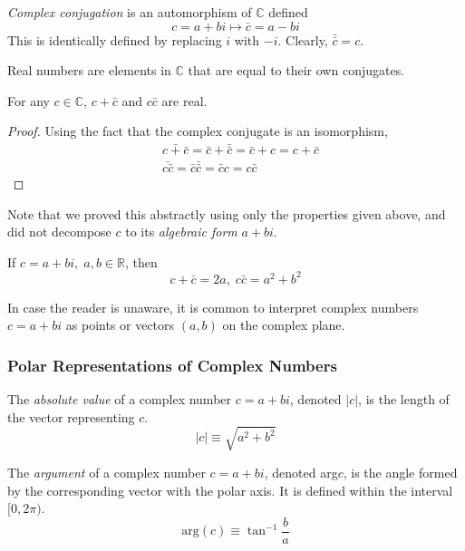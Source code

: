 \documentclass{article}
\begin{document}
    \begin{definition}
      \textit{Complex conjugation} is an automorphism of $\mathbb{C}$ defined
      \[ c = a + b i \mapsto \bar{c} = a - b i\]
      This is identically defined by replacing $i$ with $-i$. Clearly, $\bar{\bar{c}} = c$. 
    \end{definition}

    \begin{definition}
      Real numbers are elements in $\mathbb{C}$ that are equal to their own conjugates. 
    \end{definition}

    \begin{proposition}
      For any $c \in \mathbb{C}$, $c + \bar{c}$ and $c \bar{c}$ are real. 
    \end{proposition}
    \begin{proof}
      Using the fact that the complex conjugate is an isomorphism, 
      \begin{align*}
        & \bar{c + \bar{c}} = \bar{c} + \bar{\bar{c}} = \bar{c} + c = c + \bar{c} \\
        & \bar{ c \bar{c}} = \bar{c} \bar{\bar{c}} = \bar{c} c = c \bar{c}
      \end{align*}
    \end{proof}
    Note that we proved this abstractly using only the properties given above, and did not decompose $c$ to its \textit{algebraic form} $a + b i$. 

    If $c = a + b i, \; a, b \in \mathbb{R}$, then 
    \[ c + \bar{c} = 2a, \; c \bar{c} = a^2 + b^2\]

    In case the reader is unaware, it is common to interpret complex numbers $c = a + b i$ as points or vectors $(a, b)$ on the complex plane. 

    \subsubsection{Polar Representations of Complex Numbers}

      \begin{definition}
        The \textit{absolute value} of a complex number $c = a + b i$, denoted $|c|$, is the length of the vector representing $c$. 
        \[ |c| \equiv \sqrt{a^2 + b^2}\]
      \end{definition}

      \begin{definition}
        The \textit{argument} of a complex number $c = a + b i$, denoted arg$c$, is the angle formed by the corresponding vector with the polar axis. It is defined within the interval $[0, 2\pi)$. 
        \[ \text{arg}(c) \equiv \tan^{-1}{\frac{b}{a}}\]
      \end{definition}
\end{document}
